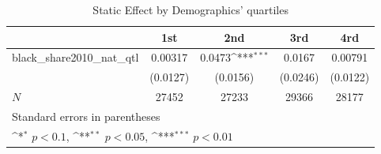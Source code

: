 \begin{table}[htbp]\centering
\def\sym#1{\ifmmode^{#1}\else\(^{#1}\)\fi}
\caption{Static Effect by Demographics' quartiles}
\begin{tabular}{l*{4}{c}}
\hline\hline
            &\multicolumn{1}{c}{1st}&\multicolumn{1}{c}{2nd}&\multicolumn{1}{c}{3rd}&\multicolumn{1}{c}{4rd}\\
\hline
black\_share2010\_nat\_qtl&     0.00317         &      0.0473\sym{***}&      0.0167         &     0.00791         \\
            &    (0.0127)         &    (0.0156)         &    (0.0246)         &    (0.0122)         \\
\hline
\(N\)       &       27452         &       27233         &       29366         &       28177         \\
\hline\hline
\multicolumn{5}{l}{\footnotesize Standard errors in parentheses}\\
\multicolumn{5}{l}{\footnotesize \sym{*} \(p<0.1\), \sym{**} \(p<0.05\), \sym{***} \(p<0.01\)}\\
\end{tabular}
\end{table}

